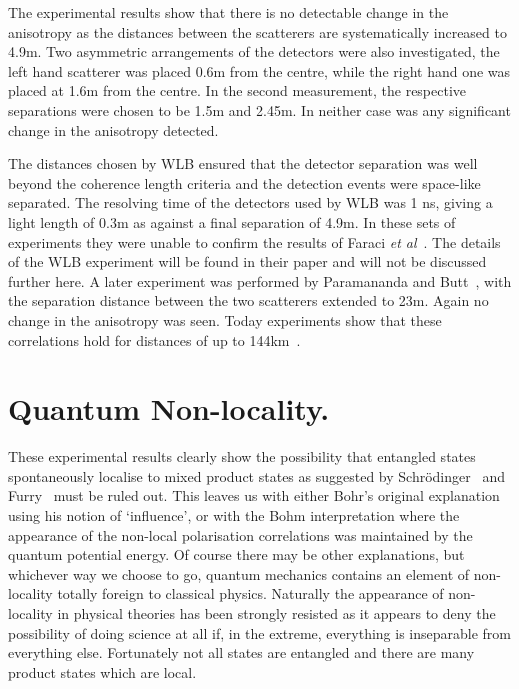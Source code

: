 \documentclass[12pt]{article}
\begin{document}
The experimental results show that there is no detectable change in the anisotropy as the  distances between the scatterers  are systematically increased to  4.9m.    Two asymmetric arrangements of the detectors were also investigated,  the left hand scatterer was placed  0.6m from the centre, while the right hand one was placed at 1.6m from the centre.  In the second measurement,  the respective separations were chosen to be 1.5m and 2.45m.
 In neither case was any significant change in the anisotropy detected.    
  
 The distances chosen by WLB ensured that the detector separation was well beyond the coherence length criteria and the detection events were space-like separated.  The resolving time of the detectors used by WLB was 1 ns, giving a light length of 0.3m as against a final separation of 4.9m.  In these sets of experiments they were unable to confirm the results of Faraci {\em et al}~\cite{dfdg74}. The details of the WLB experiment will be found in their paper and will not be discussed further here. 
A later experiment was performed by Paramananda and Butt~\cite{vpdb87}, with the separation distance between the two scatterers extended to 23m.  Again no change in the anisotropy was seen.  
Today experiments show that these correlations hold for distances of up to 144km~\cite{ruaa07}.

\section{Quantum Non-locality.}

These experimental results clearly show  the possibility that entangled states spontaneously localise to mixed product states as suggested by Schr\"{o}dinger~\cite{es35} and Furry~\cite{wf36} 
must be ruled out.  This leaves us with either Bohr's original explanation using his notion of `influence', or with the Bohm interpretation where the appearance of the non-local polarisation correlations was maintained by the quantum potential energy.  Of course there may be  other explanations, but whichever way we choose to go,  
quantum mechanics contains an element of non-locality totally foreign to classical physics. Naturally the appearance of non-locality in physical theories has been strongly resisted as it appears to deny the possibility of doing science at all if, in the extreme, everything is inseparable from everything else. Fortunately not all states are entangled and there are many product states which are local.
\end{document}
